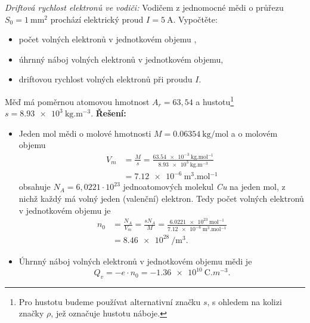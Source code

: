 \begin{mdframed}[style=mdexam]
\begin{example}\label{TEO:exam008} \emph{Driftová rychlost elektronů ve vodiči:} Vodičem z 
jednomocné mědi o
  průřezu $S_0 = \qty{1}{\mm^2}$ prochází elektrický proud $I = \qty{5}{\A}$. Vypočtěte:
  \begin{itemize}[noitemsep, leftmargin=2em]
    \item počet volných elektronů v jednotkovém objemu ,
    \item úhrnný náboj volných elektronů v jednotkovém objemu,
    \item driftovou rychlost volných elektronů při proudu \(I\).
  \end{itemize}
  Měď má poměrnou atomovou hmotnost $A_r = 63,54$ a hustotu\footnote{Pro hustotu budeme používat 
  alternativní značku $s$, s ohledem na kolizi značky $\rho$, jež označuje hustotu náboje.} $s = 
  \qty{8.93e3}{\kg.\m^{-3}}$.\newline  
  \textbf{Řešení:}
  \begin{itemize}[leftmargin=2em]
    \item Jeden mol mědi o molové hmotnosti $M = \qty{0.06354}{\kg\per\mol}$ a o molovém
          objemu 
          \begin{align*}
            V_m &= \frac{M}{s} 
                 = \frac{\qty{63.54e-3}{\kg.\mol^{-1}}}{\qty{8.93e3}{\kg.\m^{-3}}}      \\
                &= \qty{7.12e-6}{\m^3.\mol^{-1}}
          \end{align*}
          obsahuje $N_A = 6,0221\cdot10^{23}$ jednoatomových molekul \emph{Cu} na jeden mol,
          z nichž každý má volný jeden (valenční) elektron. Tedy počet volných elektronů v
          jednotkovém objemu je 
          \begin{align*}
            n_0 &= \frac{N_A}{V_m} = \frac{sN_A}{M}                                           
                 = \frac{\qty{6.0221e23}{\mol^{-1}}}{\qty{7.12e-6}{\m^{3}.\mol^{-1}}}    \\
                &= \qty{8.46e28}{\per\cubic\m}.
          \end{align*}  
    \item Úhrnný náboj volných elektronů v jednotkovém objemu mědi je 
          \begin{equation}
            Q_v = -e\cdot n_0 = \qty{-1.36e10}{\coulomb.m^{-3}}.
          \end{equation}

\end{itemize}
\end{example}
\end{mdframed}
